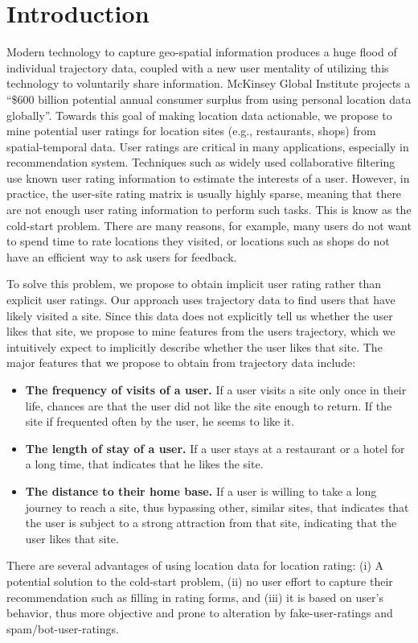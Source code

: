 \section{Introduction}\label{sec:intro}
Modern technology to capture geo-spatial information produces a
huge flood of individual trajectory data, coupled with a new
user mentality of utilizing this technology to voluntarily share information.
McKinsey Global Institute \cite{manyika2011big} projects a ``\$600 billion
potential annual consumer surplus from using personal location data globally''.
Towards this goal of making location data actionable, we propose to mine potential user ratings for location sites (e.g., restaurants, shops) from spatial-temporal data. User ratings are critical in many applications, especially in recommendation system. Techniques such as widely used collaborative filtering use known user rating information to estimate the interests of a user. However, in practice, the user-site rating matrix is usually highly sparse, meaning that there are not enough user rating information to perform such tasks. This is know as the cold-start problem. There are many reasons, for example, many users do not want to spend time to rate locations they visited, or locations such as shops do not have an efficient way to ask users for feedback.

To solve this problem, we propose to obtain implicit user rating rather than explicit user ratings. Our approach uses trajectory data to find users that have likely visited a site. 
Since this data does not explicitly tell us whether the user likes that site, we propose to mine features from the users trajectory, which we intuitively expect to implicitly describe whether the user likes that site. The major features that we propose to obtain from trajectory data include:
\begin{itemize}
\item {\bf The frequency of visits of a user.} If a user visits a site only once in their life, chances are that the user did not like the site enough to return. If the site if frequented often by the user, he seems to like it.
\item {\bf The length of stay of a user.} If a user stays at a restaurant or a hotel for a long time, that indicates that he likes the site.
\item {\bf The distance to their home base.} If a user is willing to take a long journey to reach a site, thus bypassing other, similar sites, that indicates that the user is subject to a strong attraction from that site, indicating that the user likes that site.
\end{itemize}
There are several advantages of using location data for location rating: (i) A potential solution to the cold-start problem, (ii) no user effort to capture their recommendation such as filling in rating forms, and (iii) it is based on user's behavior, thus more objective and prone to alteration by fake-user-ratings and spam/bot-user-ratings.

